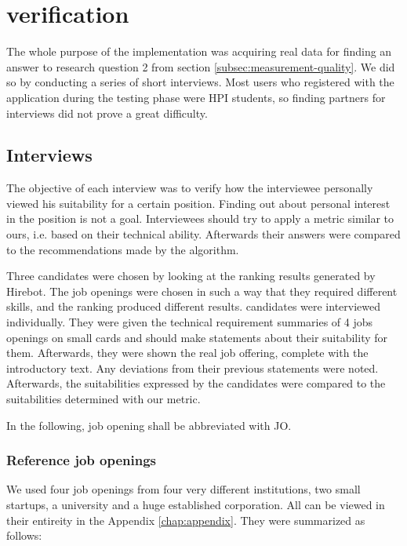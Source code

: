 \chapter{verification}\label{ch:verification}
The whole purpose of the implementation was acquiring real data for finding an answer to research question 2 from section \ref{subsec:measurement-quality}. We did so by conducting a series of short interviews. Most users who registered with the application during the testing phase were HPI students, so finding partners for interviews did not prove a great difficulty.

\section{Interviews}\label{sec:interviews}
The objective of each interview was to verify how the interviewee personally viewed his suitability for a certain position. Finding out about personal interest in the position is not a goal. Interviewees should try to apply a metric similar to ours, i.e. based on their technical ability. Afterwards their answers were compared to the recommendations made by the algorithm.

Three candidates were chosen by looking at the ranking results generated by Hirebot. The job openings were chosen in such a way that they required different skills, and the ranking produced different results. candidates were interviewed individually. They were given the technical requirement summaries of 4 jobs openings on small cards and should make statements about their suitability for them. Afterwards, they were shown the real job offering, complete with the introductory text. Any deviations from their previous statements were noted. Afterwards, the suitabilities expressed by the candidates were compared to the suitabilities determined with our metric.

In the following, job opening shall be abbreviated with JO.

\subsection{Reference job openings}
We used four job openings from four very different institutions,
two small startups, a university and a huge established corporation.
All can be viewed in their entireity in the Appendix \ref{chap:appendix}.
They were summarized as follows:

